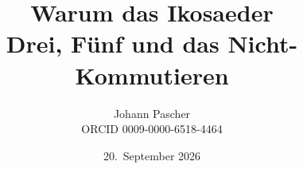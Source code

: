 \documentclass[11pt,a4paper]{report}
\title{Warum das Ikosaeder\\[0.5em]\large Drei, Fünf und das Nicht-Kommutieren}
\date{20.~September 2026}
\author{Johann Pascher\\\small ORCID 0009-0000-6518-4464}
\begin{document}
\renewcommand{\thechapter}{}
\renewcommand{\thesection}{\arabic{section}}
\maketitle
\tableofcontents

\end{document}

